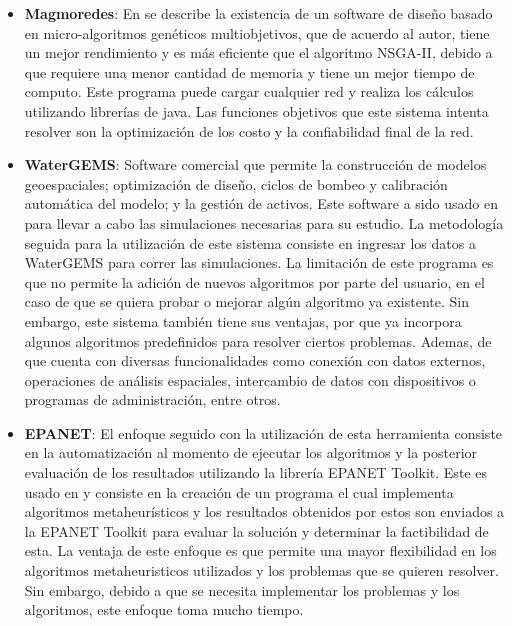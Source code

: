 \documentclass[11pt,letterpaper]{article}
\begin{document}
\begin{itemize}
	\item \textbf{Magmoredes}: En \cite{Edwin2017} se describe la existencia de un software de diseño basado en micro-algoritmos genéticos multiobjetivos, que de acuerdo al autor, tiene un mejor rendimiento y es más eficiente que el algoritmo NSGA-II, debido a que requiere una menor cantidad de memoria y tiene un mejor tiempo de computo. Este programa puede cargar cualquier red y realiza los cálculos utilizando librerías de java. Las funciones objetivos que este sistema intenta resolver son la optimización de los costo y la confiabilidad final de la red.
	
	\item \textbf{WaterGEMS}: Software comercial que permite la  construcción de modelos geoespaciales; optimización de diseño, ciclos de bombeo y calibración automática del modelo; y la  gestión de activos. Este software a sido usado en \cite{Mehta2017} para llevar a cabo las simulaciones necesarias para su estudio. La metodología seguida para la utilización de este sistema consiste en ingresar los datos a WaterGEMS para correr las simulaciones. La limitación de este programa es que no permite la adición de nuevos algoritmos por parte del usuario, en el caso de que se quiera probar o mejorar algún algoritmo ya existente. Sin embargo, este sistema también tiene sus ventajas, por que ya incorpora algunos algoritmos predefinidos para resolver ciertos problemas. Ademas, de que cuenta con diversas funcionalidades como conexión con datos externos, operaciones de análisis espaciales, intercambio de datos con dispositivos o programas de administración, entre otros.
	
	\item \textbf{EPANET}: El enfoque seguido con la utilización de esta herramienta consiste en la automatización al momento de ejecutar los algoritmos y la posterior evaluación de los resultados utilizando la librería EPANET Toolkit. Este es usado en \cite{Doctoral2012} y consiste en la creación de un programa el cual implementa algoritmos metaheurísticos y los resultados obtenidos por estos son enviados a la EPANET Toolkit para evaluar la solución y determinar la factibilidad de esta. La ventaja de este enfoque es que permite una mayor flexibilidad en los algoritmos metaheuristicos utilizados y los problemas que se quieren resolver. Sin embargo, debido a que se necesita implementar los problemas y los algoritmos, este enfoque toma mucho tiempo.
\end{itemize}
\end{document}
